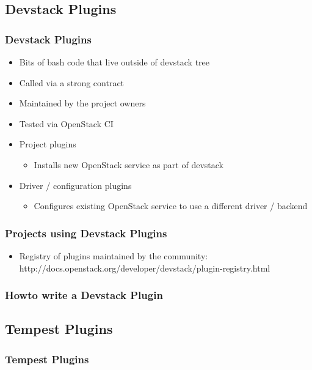 \documentclass[aspectratio=169,11pt,hyperref={colorlinks=true}]{beamer}
\begin{document}
\subsection{Devstack Plugins}
\begin{frame}
	\frametitle{Devstack Plugins}
    \begin{itemize}
    \item{Bits of bash code that live outside of devstack tree}
    \item{Called via a strong contract}
    \item{Maintained by the project owners}
    \item{Tested via OpenStack CI}
    \end{itemize}

    \begin{itemize}
    \item{Project plugins}
    	\begin{itemize}
    		\item Installs new OpenStack service as part of devstack
    	\end{itemize}
    \item{Driver / configuration plugins}
    	\begin{itemize}
    		\item Configures existing OpenStack service to use a different driver / backend
    	\end{itemize}
    \end{itemize}
\end{frame}

\begin{frame}
    \frametitle{Projects using Devstack Plugins}
    \begin{itemize}
    	\item Registry of plugins maintained by the community: \hfill
    	\\ http://docs.openstack.org/developer/devstack/plugin-registry.html
    \end{itemize}
\end{frame}

\begin{frame}
    \frametitle{Howto write a Devstack Plugin}

\end{frame}

\subsection{Tempest Plugins}
\begin{frame}
    \frametitle{Tempest Plugins}
\end{frame}
\end{document}
